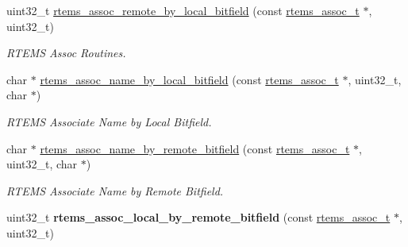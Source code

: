 \begin{DoxyCompactItemize}
\mbox{\label{group__RTEMSAPIAssociativity_ga83c18e1c1a46416f2b32dba802c3ac0a}} 
uint32\+\_\+t \mbox{\hyperlink{group__RTEMSAPIAssociativity_ga83c18e1c1a46416f2b32dba802c3ac0a}{rtems\+\_\+assoc\+\_\+remote\+\_\+by\+\_\+local\+\_\+bitfield}} (const \mbox{\hyperlink{structrtems__assoc__t}{rtems\+\_\+assoc\+\_\+t}} $\ast$, uint32\+\_\+t)
\begin{DoxyCompactList}\small\item\em R\+T\+E\+MS Assoc Routines. \end{DoxyCompactList}\item 
\mbox{\label{group__RTEMSAPIAssociativity_gaf69ae4bdf25aaa883c559e8a32805a88}} 
char $\ast$ \mbox{\hyperlink{group__RTEMSAPIAssociativity_gaf69ae4bdf25aaa883c559e8a32805a88}{rtems\+\_\+assoc\+\_\+name\+\_\+by\+\_\+local\+\_\+bitfield}} (const \mbox{\hyperlink{structrtems__assoc__t}{rtems\+\_\+assoc\+\_\+t}} $\ast$, uint32\+\_\+t, char $\ast$)
\begin{DoxyCompactList}\small\item\em R\+T\+E\+MS Associate Name by Local Bitfield. \end{DoxyCompactList}\item 
\mbox{\label{group__RTEMSAPIAssociativity_gafb200f3e8068fa8168082f900ccaa4bb}} 
char $\ast$ \mbox{\hyperlink{group__RTEMSAPIAssociativity_gafb200f3e8068fa8168082f900ccaa4bb}{rtems\+\_\+assoc\+\_\+name\+\_\+by\+\_\+remote\+\_\+bitfield}} (const \mbox{\hyperlink{structrtems__assoc__t}{rtems\+\_\+assoc\+\_\+t}} $\ast$, uint32\+\_\+t, char $\ast$)
\begin{DoxyCompactList}\small\item\em R\+T\+E\+MS Associate Name by Remote Bitfield. \end{DoxyCompactList}\item 
\mbox{\label{group__RTEMSAPIAssociativity_ga797d358d94044a9a675824dffd20735a}} 
uint32\+\_\+t {\bfseries rtems\+\_\+assoc\+\_\+local\+\_\+by\+\_\+remote\+\_\+bitfield} (const \mbox{\hyperlink{structrtems__assoc__t}{rtems\+\_\+assoc\+\_\+t}} $\ast$, uint32\+\_\+t)
\item 
\mbox{\label{group__RTEMSAPIAssociativity_gae6d128f254090af571dd199a34799b7d}} 

\end{DoxyCompactItemize}
